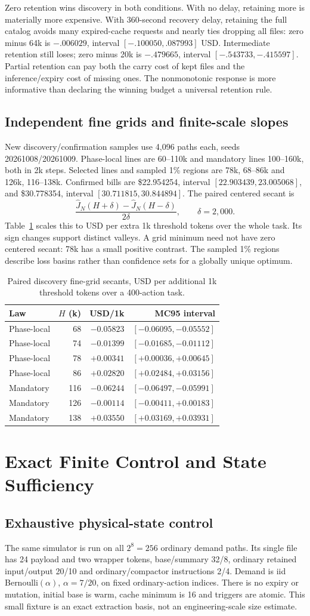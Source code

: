 \documentclass[sigconf,screen,nonacm]{acmart}
\makeatletter
\newcommand{\PaperWorkingSlopes}{%
\begin{tabular}{@{}lrrr@{}}\toprule
Law & $H$ (k) & USD/1k & MC95 interval\\\midrule
Phase-local & 68 & $-0.05823$ & $[-0.06095,-0.05552]$\\
Phase-local & 74 & $-0.01399$ & $[-0.01685,-0.01112]$\\
Phase-local & 78 & $+0.00341$ & $[+0.00036,+0.00645]$\\
Phase-local & 86 & $+0.02820$ & $[+0.02484,+0.03156]$\\
Mandatory & 116 & $-0.06244$ & $[-0.06497,-0.05991]$\\
Mandatory & 126 & $-0.00114$ & $[-0.00411,+0.00183]$\\
Mandatory & 138 & $+0.03550$ & $[+0.03169,+0.03931]$\\\bottomrule
\end{tabular}}
\makeatother
\begin{document}
Zero retention wins discovery in both conditions. With no delay, retaining
more is materially more expensive. With 360-second recovery delay, retaining
the full catalog avoids many expired-cache requests and nearly ties dropping
all files: zero minus 64k is $-.006029$, interval
$[-.100050,.087993]$ USD. Intermediate retention still loses; zero minus
20k is $-.479665$, interval $[-.543733,-.415597]$.
Partial retention can pay both the carry cost of kept files and the
inference/expiry cost of missing ones. The nonmonotonic response is more
informative than declaring the winning budget a universal retention rule.

\subsection{Independent fine grids and finite-scale slopes}
New discovery/confirmation samples use 4,096 paths each, seeds
20261008/20261009. Phase-local lines are 60--110k and mandatory lines
100--160k, both in 2k steps. Selected lines and sampled 1\% regions are
78k, 68--86k and 126k, 116--138k. Confirmed bills are \$22.954254,
interval $[22.903439,23.005068]$, and \$30.778354,
interval $[30.711815,30.844894]$.
The paired centered secant is
\begin{equation}
\frac{\widehat J_N(H+\delta)-\widehat J_N(H-\delta)}{2\delta},
\qquad\delta=2,000.
\end{equation}
Table~\ref{tab:working-slopes} scales this to USD per extra 1k threshold
tokens over the whole task. Its sign changes support distinct valleys.
A grid minimum need not have zero centered secant: 78k has a small
positive contrast. The sampled 1\% regions describe loss basins rather
than confidence sets for a globally unique optimum.

\begin{table}[t]
\centering\small
\caption{Paired discovery fine-grid secants, USD per additional 1k
threshold tokens over a 400-action task.}
\label{tab:working-slopes}\PaperWorkingSlopes
\end{table}

\section{Exact Finite Control and State Sufficiency}
\label{app:finite-experiments}

\subsection{Exhaustive physical-state control}
The same simulator is run on all $2^8=256$ ordinary demand paths. Its
single file has 24 payload and two wrapper tokens, base/summary 32/8,
ordinary retained input/output 20/10 and ordinary/compactor instructions
2/4. Demand is iid Bernoulli$(\alpha)$, $\alpha=7/20$, on fixed
ordinary-action indices. There is no expiry or mutation, initial base
is warm, cache minimum is 16 and triggers are atomic. This small fixture
is an exact extraction basis, not an engineering-scale size estimate.
\end{document}
